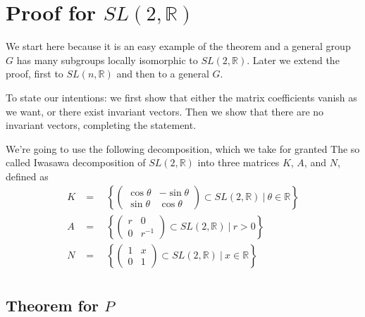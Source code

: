 \documentclass[
  12pt
]{article}
\theoremstyle{break}
\theoremstyle{plain}
\begin{document}


\hypertarget{proof-for-sl2r}{%
\section{Proof for \texorpdfstring{$SL(2, \mathbb{R})$}{SL(2, R)}}\label{proof-for-sl2r}}


  We start here because it is an easy example of the theorem and a general
  group $G$ has many subgroups locally isomorphic to
  $SL(2, \mathbb{R})$. Later we extend the proof, first to
  $SL(n, \mathbb{R})$ and then to a general $G$.

  To state our intentions: we first show that either the matrix
  coefficients vanish as we want, or there exist invariant vectors. Then
  we show that there are no invariant vectors, completing the statement.

  We're going to use the following decomposition, which we take for
  granted 
  The so called Iwasawa decomposition of $SL(2, \mathbb{R})$ into three
  matrices $K$, $A$, and $N$, defined as
  \begin{align}
  K & =\quad \left\{ \begin{pmatrix} \cos\theta & -\sin\theta \\ \sin\theta & \cos\theta\end{pmatrix} \subset SL(2, \mathbb{R})  \ | \ \theta \in \mathbb{R} \right\} \\
  A & =\quad \left\{ \begin{pmatrix} r & 0 \\ 0 & r^{-1} \end{pmatrix} \subset SL(2, \mathbb{R})  \ | \ r > 0 \right\} \\
  N & =\quad \left\{ \begin{pmatrix} 1 & x \\ 0 & 1 \end{pmatrix} \subset SL(2, \mathbb{R})  \ | \ x \in \mathbb{R} \right\}\\
  \end{align}


  \hypertarget{theorem-for-p}{%
  \subsection{Theorem for \texorpdfstring{$P$}{P}}\label{theorem-for-p}}
\end{document}
